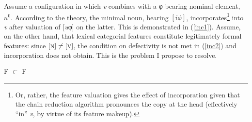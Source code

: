 \documentclass[output=paper]{langsci/langscibook}
\begin{document}
Assume a configuration in which \emph{v} combines with a φ-bearing
nominal element, $n^0$. According to the theory, the minimal noun, bearing
$[i\phi]$, incorporates\footnote{Or, rather, the feature valuation gives the
    effect of incorporation given that the chain reduction algorithm pronounces
    the copy at the head (effectively ``in'' \emph{v}, by virtue of its
feature makeup).} into \emph{v} after valuation of [\emph{u}φ] on the
latter. This is demonstrated in (\ref{inc1}). Assume, on the other hand, that
lexical categorial features constitute legitimately formal features: since
$[\textsc{n}]\neq[\textsc{v}]$, the condition on defectivity is not met in
(\ref{inc2}) and incorporation does not obtain. This is the problem I propose
to resolve.

\begin{multicols}{2}
    \begin{exe}
    \ex F $\subset$ F\\
\end{exe}
\end{multicols}
\end{document}
